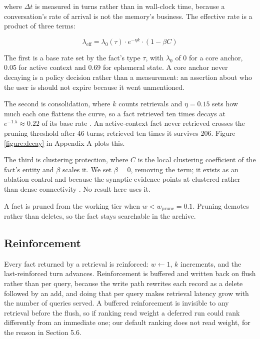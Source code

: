 \documentclass[10pt,a4paper,twocolumn]{article}
\begin{document}
where $\Delta t$ is measured in turns rather than in wall-clock time, because a conversation's rate of arrival is not the memory's business. The effective rate is a product of three terms:

\begin{equation}\label{equation:lambda}
\lambda_{\mathrm{eff}} = \lambda_{0}(\tau) \cdot e^{-\eta k} \cdot (1 - \beta C)
\end{equation}

The first is a base rate set by the fact's type $\tau$, with $\lambda_0$ of 0 for a core anchor, 0.05 for active context and 0.69 for ephemeral state. A core anchor never decaying is a policy decision rather than a measurement: an assertion about who the user is should not expire because it went unmentioned.

The second is consolidation, where $k$ counts retrievals and $\eta = 0.15$ sets how much each one flattens the curve, so a fact retrieved ten times decays at $e^{-1.5} \approx 0.22$ of its base rate \citep{bliss1973}. An active-context fact never retrieved crosses the pruning threshold after 46 turns; retrieved ten times it survives 206. Figure \ref{figure:decay} in Appendix A plots this.

The third is clustering protection, where $C$ is the local clustering coefficient of the fact's entity and $\beta$ scales it. We set $\beta = 0$, removing the term; it exists as an ablation control and because the synaptic evidence points at clustered rather than dense connectivity \citep{lin2026}. No result here uses it.

A fact is pruned from the working tier when $w < w_{\mathrm{prune}} = 0.1$. Pruning demotes rather than deletes, so the fact stays searchable in the archive.

\subsection{Reinforcement}

Every fact returned by a retrieval is reinforced: $w \leftarrow 1$, $k$ increments, and the last-reinforced turn advances. Reinforcement is buffered and written back on flush rather than per query, because the write path rewrites each record as a delete followed by an add, and doing that per query makes retrieval latency grow with the number of queries served. A buffered reinforcement is invisible to any retrieval before the flush, so if ranking read weight a deferred run could rank differently from an immediate one; our default ranking does not read weight, for the reason in Section 5.6.
\end{document}

